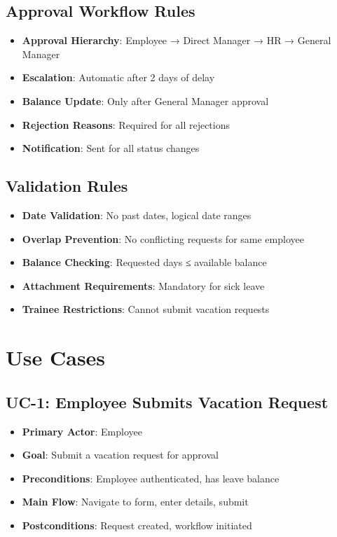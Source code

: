 \documentclass[12pt,a4paper]{article}
\begin{document}
\subsection{Approval Workflow Rules}
\begin{itemize}
    \item \textbf{Approval Hierarchy}: Employee → Direct Manager → HR → General Manager
    \item \textbf{Escalation}: Automatic after 2 days of delay
    \item \textbf{Balance Update}: Only after General Manager approval
    \item \textbf{Rejection Reasons}: Required for all rejections
    \item \textbf{Notification}: Sent for all status changes
\end{itemize}

\subsection{Validation Rules}
\begin{itemize}
    \item \textbf{Date Validation}: No past dates, logical date ranges
    \item \textbf{Overlap Prevention}: No conflicting requests for same employee
    \item \textbf{Balance Checking}: Requested days ≤ available balance
    \item \textbf{Attachment Requirements}: Mandatory for sick leave
    \item \textbf{Trainee Restrictions}: Cannot submit vacation requests
\end{itemize}

\section{Use Cases}

\subsection{UC-1: Employee Submits Vacation Request}
\begin{itemize}
    \item \textbf{Primary Actor}: Employee
    \item \textbf{Goal}: Submit a vacation request for approval
    \item \textbf{Preconditions}: Employee authenticated, has leave balance
    \item \textbf{Main Flow}: Navigate to form, enter details, submit
    \item \textbf{Postconditions}: Request created, workflow initiated
\end{itemize}
\end{document}
